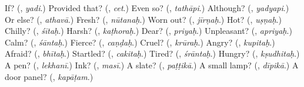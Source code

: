\begin{tcolorbox}[breakable,colback=teal!4,colframe=teal!35!black,title={Before you move on}]
If? (\textbf{}, \emph{yadi}.) Provided that? (\textbf{}, \emph{cet}.) Even so? (\textbf{}, \emph{tathāpi}.) Although? (\textbf{}, \emph{yadyapi}.) Or else? (\textbf{}, \emph{athavā}.) Fresh? (\textbf{}, \emph{nūtanaḥ}.) Worn out? (\textbf{}, \emph{jīrṇaḥ}.) Hot? (\textbf{}, \emph{uṣṇaḥ}.) Chilly? (\textbf{}, \emph{śītaḥ}.) Harsh? (\textbf{}, \emph{kaṭhoraḥ}.) Dear? (\textbf{}, \emph{priyaḥ}.) Unpleasant? (\textbf{}, \emph{apriyaḥ}.) Calm? (\textbf{}, \emph{śāntaḥ}.) Fierce? (\textbf{}, \emph{caṇḍaḥ}.) Cruel? (\textbf{}, \emph{krūraḥ}.) Angry? (\textbf{}, \emph{kupitaḥ}.) Afraid? (\textbf{}, \emph{bhītaḥ}.) Startled? (\textbf{}, \emph{cakitaḥ}.) Tired? (\textbf{}, \emph{śrāntaḥ}.) Hungry? (\textbf{}, \emph{kṣudhitaḥ}.) A pen? (\textbf{}, \emph{lekhanī}.) Ink? (\textbf{}, \emph{masī}.) A slate? (\textbf{}, \emph{paṭṭikā}.) A small lamp? (\textbf{}, \emph{dīpikā}.) A door panel? (\textbf{}, \emph{kapāṭam}.)
\end{tcolorbox}
